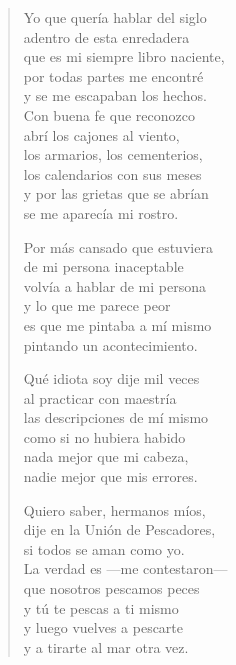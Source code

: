 \documentclass[12pt]{article}
\begin{document}
\clearpage
{}
\begin{verse}

Yo que quería hablar del siglo\\
adentro de esta enredadera\\
que es mi siempre libro naciente,\\
por todas partes me encontré\\
y se me escapaban los hechos.\\
Con buena fe que reconozco\\
abrí los cajones al viento,\\
los armarios, los cementerios,\\
los calendarios con sus meses\\
y por las grietas que se abrían\\
se me aparecía mi rostro.  

Por más cansado que estuviera\\
de mi persona inaceptable\\
volvía a hablar de mi persona\\
y lo que me parece peor\\
es que me pintaba a mí mismo\\
pintando un acontecimiento.  

Qué idiota soy dije mil veces\\
al practicar con maestría\\
las descripciones de mí mismo\\
como si no hubiera habido\\
nada mejor que mi cabeza,\\
nadie mejor que mis errores.  

Quiero saber, hermanos míos,\\
dije en la Unión de Pescadores,\\
si todos se aman como yo.\\
La verdad es —me contestaron—\\
que nosotros pescamos peces\\
y tú te pescas a ti mismo\\
y luego vuelves a pescarte\\
y a tirarte al mar otra vez.  

\end{verse}
\end{document}
